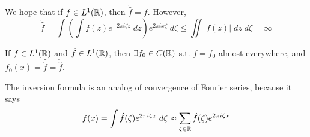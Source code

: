 \begin{rem}
    We hope that if $f \in L^1(\mathbb{R})$, then $\check{\hat{f}} = f$. However,
    \[
        \check{\hat{f}} = \int \left( \int f(z) e^{-2 \pi i \zeta z} \; dz \right) e^{2 \pi i x \zeta} \; d\zeta
        \leq \iint |f(z)| \; dz \; d \zeta = \infty
    \] 
\end{rem}
\begin{thm}
    If $f \in L^1(\mathbb{R})$ and $\hat{f} \in L^1(\mathbb{R})$, then $\exists f_0 \in C(\mathbb{R})$ s.t. $f = f_0$ almost everywhere, and
    $f_0(x) = \hat{\check{f}} = \check{\hat{f}}.$ 
\end{thm}

\begin{rem}
    The inversion formula is an analog of convergence of Fourier series, because it says
    \[
        f(x) = \int \hat{f}(\zeta) e^{2 \pi i \zeta x} \; d\zeta \approx \sum_{\zeta \in \mathbb{R}} \hat{f}(\zeta) e^{2 \pi i \zeta x}
    \]  

\end{rem}

